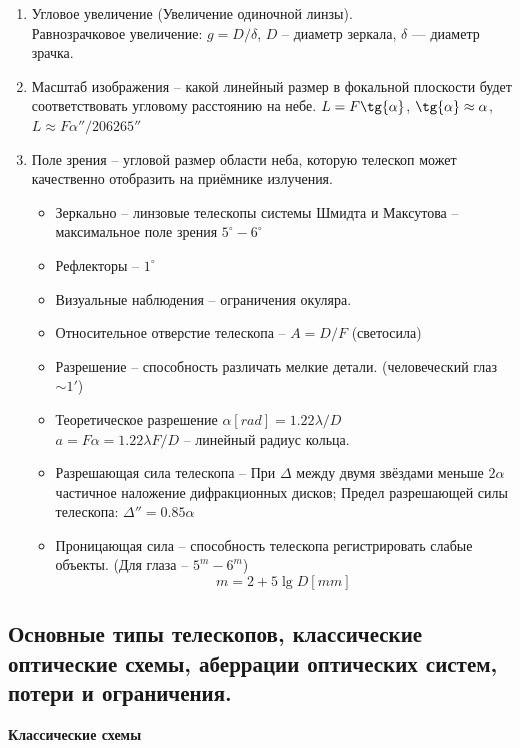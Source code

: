 \documentclass[12pt]{article}
\begin{document}
	\begin{enumerate}
		\item Угловое увеличение (Увеличение одиночной линзы).\\
		Равнозрачковое увеличение: $g = D/\delta$, $D$ -- диаметр зеркала, $\delta$ — диаметр зрачка.		
		\item Масштаб изображения -- какой линейный размер в
		фокальной плоскости будет соответствовать угловому
		расстоянию на небе. $L = F \tg{\alpha}$, $\tg{\alpha} \approx \alpha$, $L \approx F \alpha''/ 206265''$
		\item Поле зрения -- угловой размер области неба,
		которую телескоп может качественно отобразить на
		приёмнике излучения.
			\begin{itemize}
				\item Зеркально -- линзовые телескопы системы
				Шмидта и Максутова -- максимальное поле
				зрения $5^{\circ} - 6^{\circ}$
				\item Рефлекторы -- $1^{\circ}$
				\item Визуальные наблюдения -- ограничения окуляра.
				\item Относительное отверстие телескопа -- $A = D/F$ (светосила)
				\item Разрешение -- способность различать
				мелкие детали. (человеческий глаз $\sim1'$)
				\item Теоретическое разрешение $\alpha[rad] = 1.22 \lambda/D$\\
				$a = F\alpha = 1.22 \lambda F/D$ -- линейный радиус кольца.
				\item Разрешающая сила телескопа -- 
				При $\Delta$ между двумя звёздами меньше $2\alpha$
				частичное наложение дифракционных дисков;
				Предел разрешающей силы телескопа:
				$\Delta'' = 0.85 \alpha$
				\item Проницающая сила – способность телескопа
				регистрировать слабые объекты. (Для глаза – $5^{m} - 6^{m}$)
				$$m = 2 + 5\lg D [mm]$$
			\end{itemize}
			
	\end{enumerate}
	\newpage
	
	\subsection{Основные типы телескопов, классические оптические схемы, аберрации оптических систем, потери и ограничения.}
	
	\textbf{Классические схемы}
	
\end{document}
